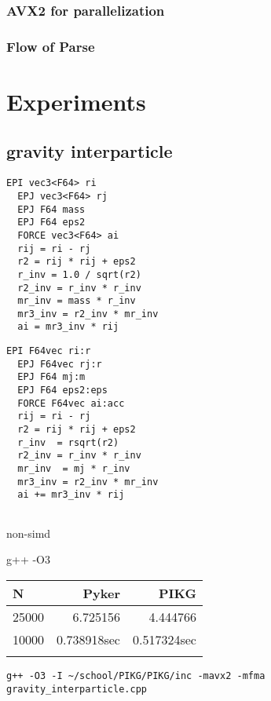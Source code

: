 \documentclass[ams]{article}
\begin{document}
\subsubsection{AVX2 for parallelization}

\subsubsection{Flow of Parse}


\section{Experiments}

\subsection{gravity interparticle}


\begin{lstlisting}[frame=single, caption=Nbody-kernel.pyker, label=Nbody-kernel.pyker]
  EPI vec3<F64> ri
  EPJ vec3<F64> rj
  EPJ F64 mass
  EPJ F64 eps2
  FORCE vec3<F64> ai
  rij = ri - rj
  r2 = rij * rij + eps2
  r_inv = 1.0 / sqrt(r2)
  r2_inv = r_inv * r_inv
  mr_inv = mass * r_inv
  mr3_inv = r2_inv * mr_inv
  ai = mr3_inv * rij
  \end{lstlisting}

\begin{lstlisting}[frame=single, caption=Nbody-kernel.pikg, label=Nbody-kernel.pikg]
  EPI F64vec ri:r
  EPJ F64vec rj:r
  EPJ F64 mj:m
  EPJ F64 eps2:eps
  FORCE F64vec ai:acc
  rij = ri - rj
  r2 = rij * rij + eps2
  r_inv  = rsqrt(r2)
  r2_inv = r_inv * r_inv
  mr_inv  = mj * r_inv
  mr3_inv = r2_inv * mr_inv
  ai += mr3_inv * rij
  
\end{lstlisting}




non-simd

g++ -O3 

\begin{tabular}{|l|r|r|} \hline
  N & Pyker & PIKG \\ \hline
  25000 & 6.725156 & 4.444766 \\
  10000 & 0.738918sec & 0.517324sec \\
 \\ \hline
\end{tabular}


\begin{lstlisting}[frame=single, caption=Nbody-kernel.pikg, label=Nbody-kernel.pikg]
  g++ -O3 -I ~/school/PIKG/PIKG/inc -mavx2 -mfma gravity_interparticle.cpp
  
  \end{lstlisting}
\end{document}
